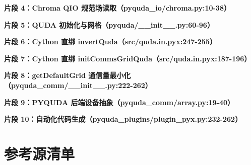 \documentclass[UTF8]{ctexart}
\begin{document}
\textbf{片段 4：Chroma QIO 规范场读取（pyquda\_io/chroma.py:10-38）}


\textbf{片段 5：QUDA 初始化与网格（pyquda/\_\_init\_\_.py:60-96）}


\textbf{片段 6：Cython 直绑 invertQuda（src/quda.in.pyx:247-255）}


\textbf{片段 7：Cython 直绑 initCommsGridQuda（src/quda.in.pyx:187-196）}


\textbf{片段 8：getDefaultGrid 通信量最小化（pyquda\_comm/\_\_init\_\_.py:222-262）}


\textbf{片段 9：PYQUDA 后端设备抽象（pyquda\_comm/array.py:19-40）}


\textbf{片段 10：自动化代码生成（pyquda\_plugins/plugin\_pyx.py:232-262）}


\section{参考源清单}
\end{document}

